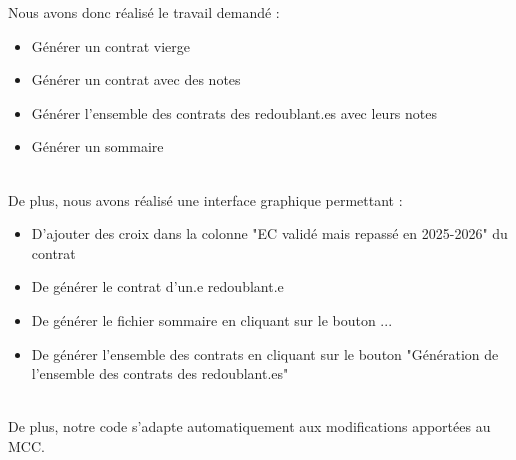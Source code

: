 Nous avons donc réalisé le travail demandé :
\begin{itemize}
    \item Générer un contrat vierge
    \item Générer un contrat avec des notes
    \item Générer l'ensemble des contrats des redoublant.es avec leurs notes
    \item Générer un sommaire
\end{itemize}

\\
De plus, nous avons réalisé une interface graphique permettant : 
\begin{itemize}
  \item D'ajouter des croix dans la colonne "EC validé mais repassé en 2025-2026" du contrat
  \item De générer le contrat d'un.e redoublant.e
  \item De générer le fichier sommaire en cliquant sur le bouton ...
  \item De générer l'ensemble des contrats en cliquant sur le bouton "Génération de l'ensemble des contrats des redoublant.es"
\end{itemize}

\\
De plus, notre code s'adapte automatiquement aux modifications apportées au MCC.